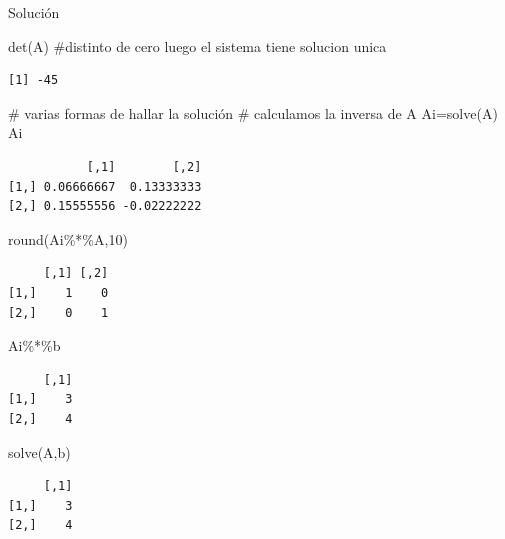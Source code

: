 \documentclass[
  ignorenonframetext,
  aspectratio=169,
  spanish,
]{beamer}
\newenvironment{Shaded}{\begin{snugshade}}{\end{snugshade}}
\newcommand{\CommentTok}[1]{\textcolor[rgb]{0.37,0.37,0.37}{#1}}
\newcommand{\DecValTok}[1]{\textcolor[rgb]{0.68,0.00,0.00}{#1}}
\newcommand{\FunctionTok}[1]{\textcolor[rgb]{0.28,0.35,0.67}{#1}}
\newcommand{\NormalTok}[1]{\textcolor[rgb]{0.00,0.23,0.31}{#1}}
\newcommand{\OtherTok}[1]{\textcolor[rgb]{0.00,0.23,0.31}{#1}}
\newcommand{\SpecialCharTok}[1]{\textcolor[rgb]{0.37,0.37,0.37}{#1}}
\begin{document}
\begin{frame}[fragile]{Solución}
\label{soluciuxf3n-1}
\begin{Shaded}
\begin{Highlighting}[]
\FunctionTok{det}\NormalTok{(A) }\CommentTok{\#distinto de cero luego el sistema tiene solucion unica }
\end{Highlighting}
\end{Shaded}

\begin{verbatim}
[1] -45
\end{verbatim}

\begin{Shaded}
\begin{Highlighting}[]
\CommentTok{\# varias formas de hallar la solución }
\CommentTok{\# calculamos la inversa de A }
\NormalTok{Ai}\OtherTok{=}\FunctionTok{solve}\NormalTok{(A) }
\NormalTok{Ai}
\end{Highlighting}
\end{Shaded}

\begin{verbatim}
           [,1]        [,2]
[1,] 0.06666667  0.13333333
[2,] 0.15555556 -0.02222222
\end{verbatim}

\begin{Shaded}
\begin{Highlighting}[]
\FunctionTok{round}\NormalTok{(Ai}\SpecialCharTok{\%*\%}\NormalTok{A,}\DecValTok{10}\NormalTok{) }
\end{Highlighting}
\end{Shaded}

\begin{verbatim}
     [,1] [,2]
[1,]    1    0
[2,]    0    1
\end{verbatim}

\begin{Shaded}
\begin{Highlighting}[]
\NormalTok{Ai}\SpecialCharTok{\%*\%}\NormalTok{b}
\end{Highlighting}
\end{Shaded}

\begin{verbatim}
     [,1]
[1,]    3
[2,]    4
\end{verbatim}

\begin{Shaded}
\begin{Highlighting}[]
\FunctionTok{solve}\NormalTok{(A,b) }
\end{Highlighting}
\end{Shaded}

\begin{verbatim}
     [,1]
[1,]    3
[2,]    4
\end{verbatim}
\end{frame}
\end{document}

